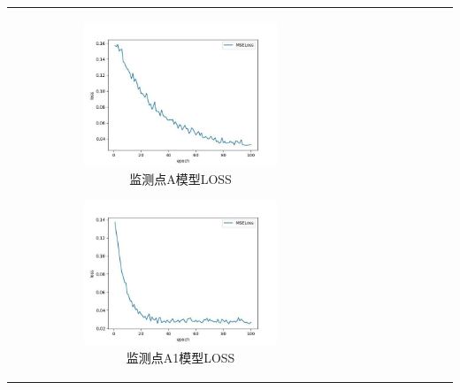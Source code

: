 \documentclass[bwprint]{gmcmthesis}
\numberwithin{figure}{section}
\begin{document}
\begin{table}
\begin{center}
{\begin{tabular}[ht]{|c|c|c|c|c|c|c|c|c|}
\begin{figure}
	\centering
	\begin{subfigure}[ht]{.3\textwidth}
		\centering
		\includegraphics[width=\textwidth]{figures/modelCov_A.jpg}
		\caption{监测点A模型LOSS}
		\label{A_Covmodel_loss}
	\end{subfigure}
	\begin{subfigure}[ht]{.3\textwidth}
		\centering
		\includegraphics[width=\textwidth]{figures/modelCov_A1.jpg}
		\caption{监测点A1模型LOSS}
		\label{A1_Covmodel_loss}
	\end{subfigure}
	\begin{subfigure}[ht]{.3\textwidth}
		\centering

\end{subfigure}
\end{figure}
\end{tabular}}
\end{center}
\end{table}
\end{document}
